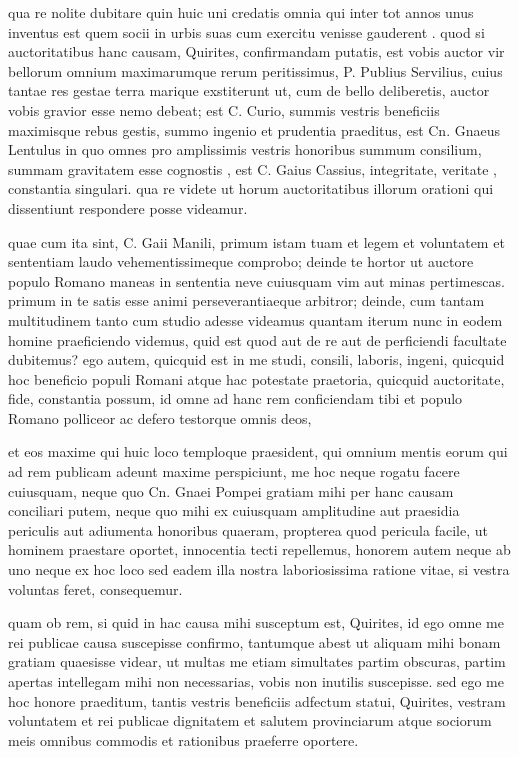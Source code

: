  qua re nolite dubitare quin huic uni credatis omnia qui inter tot annos unus inventus est quem socii in urbis suas cum exercitu venisse gauderent . quod si auctoritatibus hanc causam, Quirites, confirmandam putatis, est vobis auctor vir bellorum omnium maximarumque rerum peritissimus, P. Publius Servilius, cuius tantae res gestae terra marique exstiterunt ut, cum de bello deliberetis, auctor vobis gravior esse nemo debeat; est C. Curio, summis vestris beneficiis maximisque rebus gestis, summo ingenio et prudentia praeditus, est Cn. Gnaeus Lentulus in quo omnes pro amplissimis vestris honoribus summum consilium, summam gravitatem esse cognostis , est C. Gaius Cassius, integritate, veritate , constantia singulari. qua re videte ut horum auctoritatibus illorum orationi qui dissentiunt respondere posse videamur.

 quae cum ita sint, C. Gaii Manili, primum istam tuam et legem et voluntatem et sententiam laudo vehementissimeque comprobo; deinde te hortor ut auctore populo Romano maneas in sententia neve cuiusquam vim aut minas pertimescas. primum in te satis esse animi perseverantiaeque arbitror; deinde, cum tantam multitudinem tanto cum studio adesse videamus quantam iterum nunc in eodem homine praeficiendo videmus, quid est quod aut de re aut de perficiendi facultate dubitemus? ego autem, quicquid est in me studi, consili, laboris, ingeni, quicquid hoc beneficio populi Romani atque hac potestate praetoria, quicquid auctoritate, fide, constantia possum, id omne ad hanc rem conficiendam tibi et populo Romano polliceor ac defero testorque omnis deos,

 et eos maxime qui huic loco temploque praesident, qui omnium mentis eorum qui ad rem publicam adeunt maxime perspiciunt, me hoc neque rogatu facere cuiusquam, neque quo Cn. Gnaei Pompei gratiam mihi per hanc causam conciliari putem, neque quo mihi ex cuiusquam amplitudine aut praesidia periculis aut adiumenta honoribus quaeram, propterea quod pericula facile, ut hominem praestare oportet, innocentia tecti repellemus, honorem autem neque ab uno neque ex hoc loco sed eadem illa nostra laboriosissima ratione vitae, si vestra voluntas feret, consequemur.

 quam ob rem, si quid in hac causa mihi susceptum est, Quirites, id ego omne me rei publicae causa suscepisse confirmo, tantumque abest ut aliquam mihi bonam gratiam quaesisse videar, ut multas me etiam simultates partim obscuras, partim apertas intellegam mihi non necessarias, vobis non inutilis suscepisse. sed ego me hoc honore praeditum, tantis vestris beneficiis adfectum statui, Quirites, vestram voluntatem et rei publicae dignitatem et salutem provinciarum atque sociorum meis omnibus commodis et rationibus praeferre oportere.
